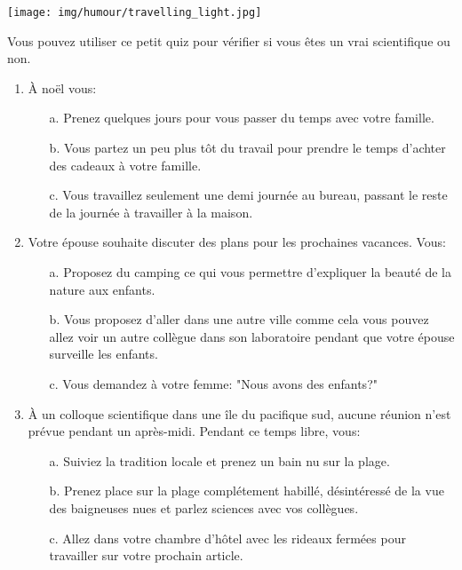	\begin{center}\underline{\hspace{5 cm}}\end{center}
		\begin{center}
		\texttt{[image: img/humour/travelling\_light.jpg]}	
	\end{center}

\pagebreak
Vous pouvez utiliser ce petit quiz pour vérifier si vous êtes un vrai scientifique ou non.

\begin{enumerate}
	\item À noël vous: 
	\begin{enumerate}
		\item[a.] Prenez quelques jours pour vous passer du temps avec votre famille.
		\item[b.] Vous partez un peu plus tôt du travail pour prendre le temps d'achter des cadeaux à votre famille. 
		\item[c.] Vous travaillez seulement une demi journée au bureau, passant le reste de la journée à travailler à la maison.
	\end{enumerate}

	\item Votre épouse souhaite discuter des plans pour les prochaines vacances. Vous:
	\begin{enumerate}
		\item[a.] Proposez du camping ce qui vous permettre d'expliquer la beauté de la nature aux enfants.
		\item[b.] Vous proposez d'aller dans une autre ville comme cela vous pouvez allez voir un autre collègue dans son laboratoire pendant que votre épouse surveille les enfants.
		\item[c.] Vous demandez à votre femme: "Nous avons des enfants?"
	\end{enumerate}

	\item À un colloque scientifique dans une île du pacifique sud, aucune réunion n'est prévue pendant un après-midi. Pendant ce temps libre, vous: 
	\begin{enumerate}
		\item[a.] Suiviez la tradition locale et prenez un bain nu sur la plage.
		\item[b.] Prenez place sur la plage complétement habillé, désintéressé de la vue des baigneuses nues et parlez sciences avec vos collègues.
		\item[c.] Allez dans votre chambre d'hôtel avec les rideaux fermées pour travailler sur votre prochain article.
	\end{enumerate}


\end{enumerate}
